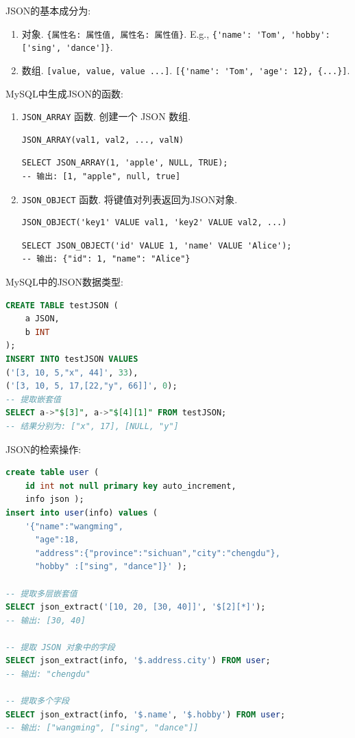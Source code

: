 JSON的基本成分为:
\begin{enumerate}
    \item 对象. \verb|{属性名: 属性值, 属性名: 属性值}|. E.g., \verb|{'name': 'Tom', 'hobby': ['sing', 'dance']}|.
    \item 数组. \verb|[value, value, value ...]|. \verb|[{'name': 'Tom', 'age': 12}, {...}]|.
\end{enumerate}

MySQL中生成JSON的函数:
\begin{enumerate}
    \item \texttt{JSON\_ARRAY} 函数. 创建一个 JSON 数组.
    \begin{verbatim}
JSON_ARRAY(val1, val2, ..., valN)
    \end{verbatim}
    \begin{verbatim}
SELECT JSON_ARRAY(1, 'apple', NULL, TRUE);
-- 输出: [1, "apple", null, true]
    \end{verbatim}
    \item \texttt{JSON\_OBJECT} 函数. 将键值对列表返回为JSON对象.
    \begin{verbatim}
JSON_OBJECT('key1' VALUE val1, 'key2' VALUE val2, ...)
    \end{verbatim}
    \begin{verbatim}
SELECT JSON_OBJECT('id' VALUE 1, 'name' VALUE 'Alice');
-- 输出: {"id": 1, "name": "Alice"}
    \end{verbatim}
\end{enumerate}

MySQL中的JSON数据类型:
\begin{lstlisting}[language=SQL]
CREATE TABLE testJSON (
    a JSON,
    b INT
);
INSERT INTO testJSON VALUES
('[3, 10, 5,"x", 44]', 33),
('[3, 10, 5, 17,[22,"y", 66]]', 0);
-- 提取嵌套值
SELECT a->"$[3]", a->"$[4][1]" FROM testJSON;
-- 结果分别为: ["x", 17], [NULL, "y"]
\end{lstlisting}

JSON的检索操作:
\begin{lstlisting}[language=SQL]
create table user (
    id int not null primary key auto_increment,
    info json );
insert into user(info) values (
    '{"name":"wangming",
      "age":18,
      "address":{"province":"sichuan","city":"chengdu"},
      "hobby" :["sing", "dance"]}' );

-- 提取多层嵌套值
SELECT json_extract('[10, 20, [30, 40]]', '$[2][*]');
-- 输出: [30, 40]

-- 提取 JSON 对象中的字段
SELECT json_extract(info, '$.address.city') FROM user;
-- 输出: "chengdu"

-- 提取多个字段
SELECT json_extract(info, '$.name', '$.hobby') FROM user;
-- 输出: ["wangming", ["sing", "dance"]]
\end{lstlisting}

